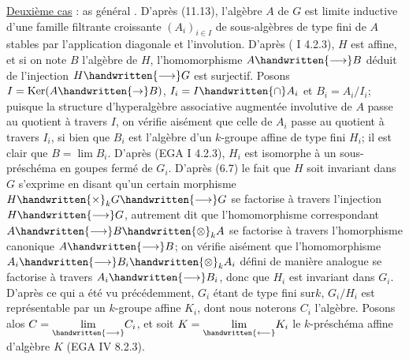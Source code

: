 \uline{Deuxième cas} : as général . D'après (11.13), l'algèbre $A$ de $G$ est limite inductive d'une famille filtrante croissante $(A_i)_{i\in I}$ de sous-algèbres de type fini de $A$ stables par l'application diagonale et l'involution. D'après ( I 4.2.3), $H$ est affine, et si on note $B$ l'algèbre de $H$, l'homomorphisme $A\handwritten{\longrightarrow}B$ déduit de l'injection $H\handwritten{\longrightarrow}G$ est surjectif. Posons $I=\operatorname{Ker}(A\handwritten{\to}B)$, $I_i=I\handwritten{\cap}A_i$ et $B_i=A_i/I_i$; puisque la structure d'hyperalgèbre associative augmentée involutive de $A$ passe au quotient à travers $I$, on vérifie aisément que celle de $A_i$ passe au quotient à travers $I_i$, si bien que $B_i$ est l'algèbre d'un $k$-groupe affine de type fini $H_i$; il est clair que $B=\lim B_i$. D'après (EGA I 4.2.3), $H_i$ est isomorphe à un sous-préschéma en goupes fermé de $G_i$. D'après (6.7) le fait que $H$ soit invariant dans $G$ s'exprime en disant qu'un certain morphisme $H\handwritten{\times}_k G\handwritten{\longrightarrow}G$ se factorise à travers l'injection $H\handwritten{\longrightarrow}G$, autrement dit que l'homomorphisme correspondant $A\handwritten{\longrightarrow}B\handwritten{\otimes}_k A$ se factorise à travers l'homorphisme canonique $A\handwritten{\longrightarrow}B$; on vérifie aisément que l'homomorphisme $A_i\handwritten{\longrightarrow}B_i\handwritten{\otimes}_k A_i$ défini de manière analogue se factorise à travers $A_i\handwritten{\longrightarrow}B_i$, donc que $H_i$ est invariant dans $G_i$. D'après ce qui a été vu précédemment, $G_i$ étant de type fini sur\inserted{\handwritten{\ }}$k$, $G_i/H_i$ est représentable par un $k$-groupe affine $K_i$, dont nous noterons $C_i$ l'algèbre. Posons alos $C=\underset{\handwritten{\longrightarrow}}{\lim}C_i$, et soit $K=\underset{\handwritten{\longleftarrow}}{\lim}K_i$ le $k$-préschéma affine d'algèbre $K$ (EGA IV 8.2.3).

